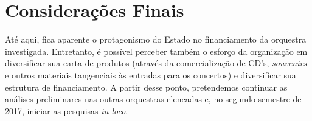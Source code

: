 \documentclass[a4paper, 12pt, openright, oneside, german, french, english, brazil]{abntex2}
\begin{document}







	\chapter{Considerações Finais}










	Até aqui, fica aparente o protagonismo do Estado no financiamento da orquestra investigada. Entretanto, é possível perceber também o esforço da organização em diversificar sua carta de produtos (através da comercialização de CD's, \textit{souvenirs} e outros materiais tangenciais às entradas para os concertos) e diversificar sua estrutura de financiamento. A partir desse ponto, pretendemos continuar as análises preliminares nas outras orquestras elencadas e, no segundo semestre de 2017, iniciar as pesquisas \textit{in loco}.
\end{document}
